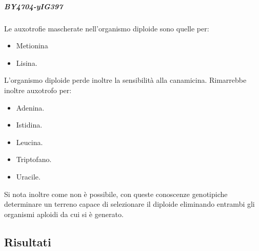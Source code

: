 				\subparagraph*{BY4704-yIG397}
				Le auxotrofie mascherate nell'organismo diploide sono quelle per:
				\begin{multicols}{2}
					\begin{itemize}
						\item Metionina
						\item Lisina.
					\end{itemize}
				\end{multicols}
				L'organismo diploide perde inoltre la sensibilit\`a alla canamicina.
				Rimarrebbe inoltre auxotrofo per:
				\begin{multicols}{4}
					\begin{itemize}
						\item Adenina.
						\item Istidina.
						\item Leucina.
						\item Triptofano.
						\item Uracile.
					\end{itemize}
				\end{multicols}
				Si nota inoltre come non \`e possibile, con queste conoscenze genotipiche determinare un terreno capace di selezionare il diploide eliminando entrambi gli organismi aploidi da cui si \`e generato.
	\subsection*{Risultati}
	
